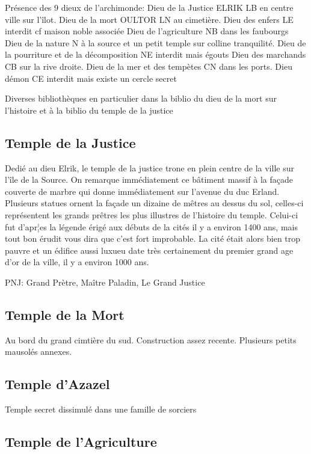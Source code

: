 Présence des 9 dieux de l'archimonde:
Dieu de la Justice ELRIK LB en centre ville sur l'îlot.
Dieu de la mort OULTOR LN au cimetière.
Dieu des enfers LE interdit cf maison noble associée
Dieu de l'agriculture NB dans les faubourgs
Dieu de la nature N à la source et un petit temple sur colline tranquilité.
Dieu de la pourriture et de la décomposition NE interdit mais égouts
Dieu des marchands CB sur la rive droite.
Dieu de la mer et des tempètes CN dans les ports. 
Dieu démon CE interdit mais existe un cercle secret

Diverses bibliothèques en particulier dans la biblio du dieu de la mort
sur l'histoire et à la biblio du temple de la justice

\subsection{Temple de la Justice}

Dedié au dieu Elrik, le temple de la justice trone en plein centre de la ville sur l'île de la Source.
On remarque immédiatement ce bâtiment massif à la façade couverte de marbre qui donne immédiatement
sur l'avenue du duc Erland. Plusieurs statues ornent la façade un dizaine de mêtres au dessus du sol,
celles-ci représentent les grands prêtres les plus illustres de l'histoire du temple. Celui-ci fut 
d'apr¦es la légende érigé aux débuts de la cités il y a environ 1400 ans, mais tout bon érudit vous
dira que c'est fort improbable. La cité était alors bien trop pauvre et un édifice aussi luxueu date très 
certainement du premier grand age d'or de la ville, il y a environ 1000 ans.

PNJ: Grand Prètre, Maître Paladin, Le Grand Justice

\subsection{Temple de la Mort}

Au bord du grand cimtière du sud. Construction assez recente. Plusieurs petits mausolés annexes.

\subsection{Temple d'Azazel}

Temple secret dissimulé dans une famille de sorciers

\subsection{Temple de l'Agriculture}

